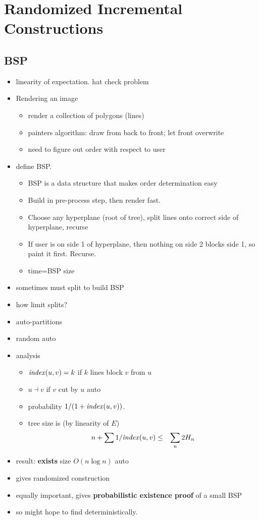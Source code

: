 \documentclass{article}
\begin{document}
\section{Randomized Incremental Constructions}

\subsection*{BSP}

\begin{itemize}
\item linearity of expectation.  hat check problem
\item Rendering an image
\begin{itemize}
\item render a collection of polygons (lines)
\item painters algorithm: draw from back to front; let front overwrite
\item need to figure out order with respect to user
\end{itemize}
\item define BSP.  
\begin{itemize}
\item BSP is a data structure that makes order determination easy
\item Build in pre-process step, then render fast.
\item Choose any hyperplane (root of tree), split lines onto correct
  side of hyperplane, recurse
\item If user is on side 1 of hyperplane, then nothing on side 2
  blocks side 1, so paint it first.  Recurse.
\item time=BSP size
\end{itemize}
\item sometimes must split to build BSP
\item how limit splits?
\item auto-partitions
\item random auto
\item analysis
  \begin{itemize}
  \item $\mathit{index}(u,v)=k$ if $k$ lines block $v$ from $u$
  \item $u \dashv v$ if $v$ cut by $u$ auto
  \item probability $1/(1+\mathit{index}(u,v))$.
  \item tree size is (by linearity of $E$)
    \begin{eqnarray*}
      n+\sum 1/\mathit{index}(u,v) &\le & \sum_u 2H_n
    \end{eqnarray*}
  \end{itemize}
\item result: \textbf{ exists} size $O(n\log n)$ auto
\item gives randomized construction
\item equally important, gives \textbf{ probabilistic existence proof} of
  a small BSP
\item so might hope to find deterministically.
\end{itemize}
\end{document}
